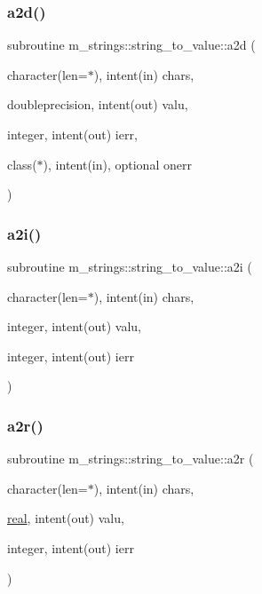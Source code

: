 \subsubsection{\texorpdfstring{a2d()}{a2d()}}
{\footnotesize\ttfamily subroutine m\+\_\+strings\+::string\+\_\+to\+\_\+value\+::a2d (\begin{DoxyParamCaption}\item[{character(len=$\ast$), intent(in)}]{chars,  }\item[{doubleprecision, intent(out)}]{valu,  }\item[{integer, intent(out)}]{ierr,  }\item[{class($\ast$), intent(in), optional}]{onerr }\end{DoxyParamCaption})\hspace{0.3cm}{\ttfamily [private]}}

\mbox{\label{interfacem__strings_1_1string__to__value_a2089572a0b06d524be83d9089589c959}} 
\subsubsection{\texorpdfstring{a2i()}{a2i()}}
{\footnotesize\ttfamily subroutine m\+\_\+strings\+::string\+\_\+to\+\_\+value\+::a2i (\begin{DoxyParamCaption}\item[{character(len=$\ast$), intent(in)}]{chars,  }\item[{integer, intent(out)}]{valu,  }\item[{integer, intent(out)}]{ierr }\end{DoxyParamCaption})\hspace{0.3cm}{\ttfamily [private]}}

\mbox{\label{interfacem__strings_1_1string__to__value_aec779c978fa7bcc812c6cb029321b5f0}} 
\subsubsection{\texorpdfstring{a2r()}{a2r()}}
{\footnotesize\ttfamily subroutine m\+\_\+strings\+::string\+\_\+to\+\_\+value\+::a2r (\begin{DoxyParamCaption}\item[{character(len=$\ast$), intent(in)}]{chars,  }\item[{\mbox{\hyperlink{interfacem__strings_1_1real}{real}}, intent(out)}]{valu,  }\item[{integer, intent(out)}]{ierr }\end{DoxyParamCaption})\hspace{0.3cm}{\ttfamily [private]}}



